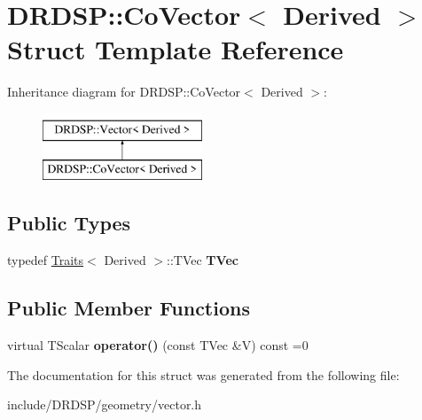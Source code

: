 \hypertarget{struct_d_r_d_s_p_1_1_co_vector}{\section{D\-R\-D\-S\-P\-:\-:Co\-Vector$<$ Derived $>$ Struct Template Reference}
\label{struct_d_r_d_s_p_1_1_co_vector}
}
Inheritance diagram for D\-R\-D\-S\-P\-:\-:Co\-Vector$<$ Derived $>$\-:\begin{figure}[H]
\begin{center}
\leavevmode
\includegraphics[height=2.000000cm]{struct_d_r_d_s_p_1_1_co_vector}
\end{center}
\end{figure}
\subsection*{Public Types}
\begin{DoxyCompactItemize}
\item 
\hypertarget{struct_d_r_d_s_p_1_1_co_vector_ab4fce97a89ef7f12ec0469c68283a36b}{typedef \hyperlink{struct_d_r_d_s_p_1_1_traits}{Traits}$<$ Derived $>$\-::T\-Vec {\bfseries T\-Vec}}\label{struct_d_r_d_s_p_1_1_co_vector_ab4fce97a89ef7f12ec0469c68283a36b}

\end{DoxyCompactItemize}
\subsection*{Public Member Functions}
\begin{DoxyCompactItemize}
\item 
\hypertarget{struct_d_r_d_s_p_1_1_co_vector_a9a378efe5267d0bba22b194b3dc0698b}{virtual T\-Scalar {\bfseries operator()} (const T\-Vec \&V) const =0}\label{struct_d_r_d_s_p_1_1_co_vector_a9a378efe5267d0bba22b194b3dc0698b}

\end{DoxyCompactItemize}


The documentation for this struct was generated from the following file\-:\begin{DoxyCompactItemize}
\item 
include/\-D\-R\-D\-S\-P/geometry/vector.\-h\end{DoxyCompactItemize}

